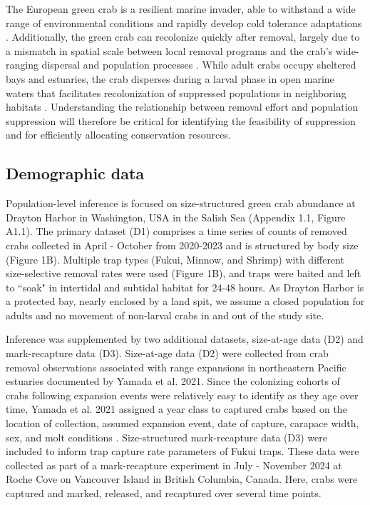 \documentclass{article}
\begin{document}
The European green crab is a resilient marine invader, able to withstand a wide range of environmental conditions and rapidly develop cold tolerance adaptations \parencite{tepolt2020rapid}. Additionally, the green crab can recolonize quickly after removal, largely due to a mismatch in spatial scale between local removal programs and the crab’s wide-ranging dispersal and population processes \parencite{keller2025transition}. While adult crabs occupy sheltered bays and estuaries, the crab disperses during a larval phase in open marine waters that facilitates recolonization of suppressed populations in neighboring habitats \parencite{yamada2021ocean}. Understanding the relationship between removal effort and population suppression will therefore be critical for identifying the feasibility of suppression and for efficiently allocating conservation resources. 

\subsection{Demographic data}

Population-level inference is focused on size-structured green crab abundance at Drayton Harbor in Washington, USA in the Salish Sea (Appendix 1.1, Figure A1.1). The primary dataset (D1) comprises a time series of counts of removed crabs collected in April - October from 2020-2023 and is structured by body size (Figure 1B). Multiple trap types (Fukui, Minnow, and Shrimp) with different size-selective removal rates were used (Figure 1B), and traps were baited and left to ``soak" in intertidal and subtidal habitat for 24-48 hours. As Drayton Harbor is a protected bay, nearly enclosed by a land spit, we assume a closed population for adults and no movement of non-larval crabs in and out of the study site. 

Inference was supplemented by two additional datasets, size-at-age data (D2) and mark-recapture data (D3). Size-at-age data (D2) were collected from crab removal observations associated with range expansions in northeastern Pacific estuaries documented by Yamada et al. 2021. Since the colonizing cohorts of crabs following expansion events were relatively easy to identify as they age over time, Yamada et al. 2021 assigned a year class to captured crabs based on the location of collection, assumed expansion event, date of capture, carapace width, sex, and molt conditions \parencite{yamada2021ocean}. Size-structured mark-recapture data (D3) were included to inform trap capture rate parameters of Fukui traps. These data were collected as part of a mark-recapture experiment in July - November 2024 at Roche Cove on Vancouver Island in British Columbia, Canada. Here, crabs were captured and marked, released, and recaptured over several time points.
\end{document}
